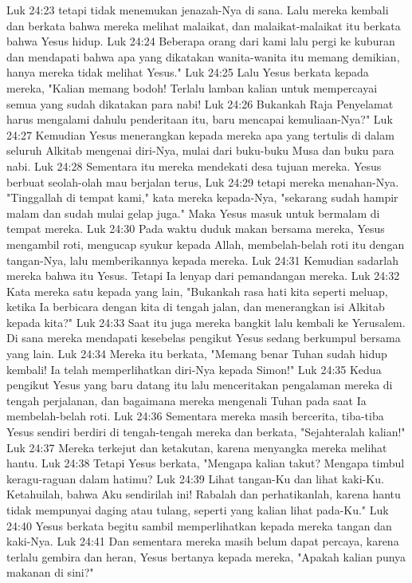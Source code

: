 Luk 24:23  tetapi tidak menemukan jenazah-Nya di sana. Lalu mereka kembali dan berkata bahwa mereka melihat malaikat, dan malaikat-malaikat itu berkata bahwa Yesus hidup.
Luk 24:24  Beberapa orang dari kami lalu pergi ke kuburan dan mendapati bahwa apa yang dikatakan wanita-wanita itu memang demikian, hanya mereka tidak melihat Yesus."
Luk 24:25  Lalu Yesus berkata kepada mereka, "Kalian memang bodoh! Terlalu lamban kalian untuk mempercayai semua yang sudah dikatakan para nabi!
Luk 24:26  Bukankah Raja Penyelamat harus mengalami dahulu penderitaan itu, baru mencapai kemuliaan-Nya?"
Luk 24:27  Kemudian Yesus menerangkan kepada mereka apa yang tertulis di dalam seluruh Alkitab mengenai diri-Nya, mulai dari buku-buku Musa dan buku para nabi.
Luk 24:28  Sementara itu mereka mendekati desa tujuan mereka. Yesus berbuat seolah-olah mau berjalan terus,
Luk 24:29  tetapi mereka menahan-Nya. "Tinggallah di tempat kami," kata mereka kepada-Nya, "sekarang sudah hampir malam dan sudah mulai gelap juga." Maka Yesus masuk untuk bermalam di tempat mereka.
Luk 24:30  Pada waktu duduk makan bersama mereka, Yesus mengambil roti, mengucap syukur kepada Allah, membelah-belah roti itu dengan tangan-Nya, lalu memberikannya kepada mereka.
Luk 24:31  Kemudian sadarlah mereka bahwa itu Yesus. Tetapi Ia lenyap dari pemandangan mereka.
Luk 24:32  Kata mereka satu kepada yang lain, "Bukankah rasa hati kita seperti meluap, ketika Ia berbicara dengan kita di tengah jalan, dan menerangkan isi Alkitab kepada kita?"
Luk 24:33  Saat itu juga mereka bangkit lalu kembali ke Yerusalem. Di sana mereka mendapati kesebelas pengikut Yesus sedang berkumpul bersama yang lain.
Luk 24:34  Mereka itu berkata, "Memang benar Tuhan sudah hidup kembali! Ia telah memperlihatkan diri-Nya kepada Simon!"
Luk 24:35  Kedua pengikut Yesus yang baru datang itu lalu menceritakan pengalaman mereka di tengah perjalanan, dan bagaimana mereka mengenali Tuhan pada saat Ia membelah-belah roti.
Luk 24:36  Sementara mereka masih bercerita, tiba-tiba Yesus sendiri berdiri di tengah-tengah mereka dan berkata, "Sejahteralah kalian!"
Luk 24:37  Mereka terkejut dan ketakutan, karena menyangka mereka melihat hantu.
Luk 24:38  Tetapi Yesus berkata, "Mengapa kalian takut? Mengapa timbul keragu-raguan dalam hatimu?
Luk 24:39  Lihat tangan-Ku dan lihat kaki-Ku. Ketahuilah, bahwa Aku sendirilah ini! Rabalah dan perhatikanlah, karena hantu tidak mempunyai daging atau tulang, seperti yang kalian lihat pada-Ku."
Luk 24:40  Yesus berkata begitu sambil memperlihatkan kepada mereka tangan dan kaki-Nya.
Luk 24:41  Dan sementara mereka masih belum dapat percaya, karena terlalu gembira dan heran, Yesus bertanya kepada mereka, "Apakah kalian punya makanan di sini?"
